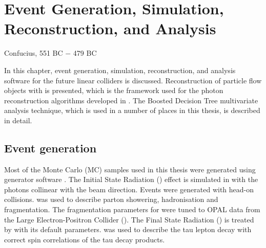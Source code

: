 \chapter{Event Generation, Simulation, Reconstruction, and Analysis}
\label{chap:Reconstruction}

%
{Confucius, 551 BC $-$ 479 BC}%





In this chapter, event generation, simulation, reconstruction, and analysis software for the future linear colliders is discussed. Reconstruction of particle flow objects with \pandora is presented, which is the framework used for the photon reconstruction algorithms developed in . The Boosted Decision Tree multivariate analysis technique, which is used in a number of places in this thesis, is described in detail.



\section{Event generation}
\label{sec:pandoraMC}

Most of the Monte Carlo (MC) samples used in this thesis were generated using \WHIZARD generator software \cite{whizard,Moretti:2001zz}. The Initial State Radiation (\ISR) effect is simulated in \WHIZARD with the \ISR photons  collinear with the beam direction. Events were generated with head-on \ee collisions. \PYTHIA \cite{Sjostrand:1995iq} was used to describe parton showering, hadronisation and fragmentation. The fragmentation parameters for \PYTHIA were tuned to OPAL data \cite{Alexander:1995bk} from the Large Electron-Positron Collider (\LEP). The Final State Radiation (\FSR) is treated by \PYTHIA with its default parameters. \TAUOLA \cite{Jadach:1993hs} was used to describe the tau lepton decay with correct spin correlations of the tau decay products.

